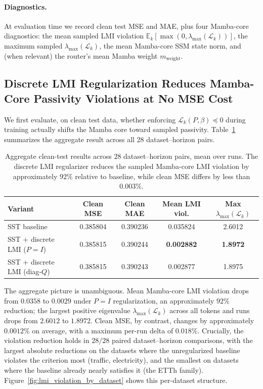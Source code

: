 \documentclass[10pt]{article} %
\theoremstyle{definition}
\begin{document}
\paragraph{Diagnostics.}
At evaluation time we record clean test MSE and MAE, plus four Mamba-core diagnostics: the mean sampled LMI violation $\mathbb{E}_k[\max(0,\lambda_{\max}(\mathcal{L}_k))]$, the maximum sampled $\lambda_{\max}(\mathcal{L}_k)$, the mean Mamba-core SSM state norm, and (when relevant) the router's mean Mamba weight $m_{\text{weight}}$.

\subsection{Discrete LMI Regularization Reduces Mamba-Core Passivity Violations at No MSE Cost}
\label{subsec:clean_lmi_results}

We first evaluate, on clean test data, whether enforcing $\mathcal{L}_k(P,\beta)\preceq 0$ during training actually shifts the Mamba core toward sampled passivity. Table~\ref{tab:lmi_main_clean} summarizes the aggregate result across all 28 dataset--horizon pairs.

\begin{table}[h]
\centering
\small
\begin{tabular}{l c c c c}
\toprule
\textbf{Variant} & \textbf{Clean MSE} & \textbf{Clean MAE} & \textbf{Mean LMI viol.} & \textbf{Max $\lambda_{\max}(\mathcal{L}_k)$}\\
\midrule
SST baseline                  & 0.385804 & 0.390236 & 0.035824   & 2.6012\\
SST + discrete LMI ($P=I$)    & 0.385815 & 0.390244 & \textbf{0.002882} & \textbf{1.8972}\\
SST + discrete LMI (diag-$Q$) & 0.385815 & 0.390243 & 0.002877   & 1.8975\\
\bottomrule
\end{tabular}
\caption{Aggregate clean-test results across $28$ dataset--horizon pairs, mean over runs. The discrete LMI regularizer reduces the sampled Mamba-core LMI violation by approximately $92\%$ relative to baseline, while clean MSE differs by less than $0.003\%$.}
\label{tab:lmi_main_clean}
\end{table}

The aggregate picture is unambiguous. Mean Mamba-core LMI violation drops from $0.0358$ to $0.0029$ under $P=I$ regularization, an approximately $92\%$ reduction; the largest positive eigenvalue $\lambda_{\max}(\mathcal{L}_k)$ across all tokens and runs drops from $2.6012$ to $1.8972$. Clean MSE, by contrast, changes by approximately $0.0012\%$ on average, with a maximum per-run delta of $0.018\%$. Crucially, the violation reduction holds in $28/28$ paired dataset--horizon comparisons, with the largest absolute reductions on the datasets where the unregularized baseline violates the criterion most (traffic, electricity), and the smallest on datasets where the baseline already nearly satisfies it (the ETTh family). Figure~\ref{fig:lmi_violation_by_dataset} shows this per-dataset structure.
\end{document}
